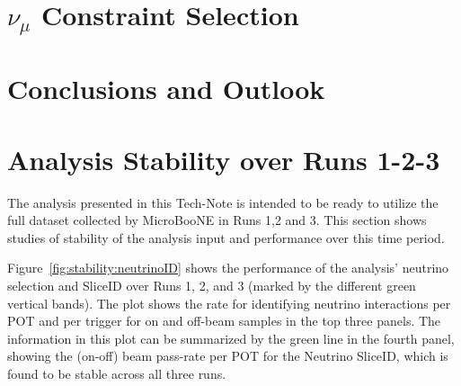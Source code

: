 \documentclass[a4paper]{article}
\begin{document}

\newpage





\clearpage


\section{$\nu_{\mu}$ Constraint Selection }
\label{sec:numuselection}

\clearpage

%

\clearpage



\newpage

\newpage

\section{Conclusions and Outlook}



\newpage

\appendix


\section{Analysis Stability over Runs 1-2-3}
\label{sec:timestability}

\par The analysis presented in this Tech-Note is intended to be ready to utilize the full dataset collected by MicroBooNE in Runs 1,2 and 3. This section shows studies of stability of the analysis input and performance over this time period.
\par Figure~\ref{fig:stability:neutrinoID} shows the performance of the analysis' neutrino selection and SliceID over Runs 1, 2, and 3 (marked by the different green vertical bands). The plot shows the rate for identifying neutrino interactions per POT and per trigger for on and off-beam samples in the top three panels. The information in this plot can be summarized by the green line in the fourth panel, showing the (on-off) beam pass-rate per POT for the Neutrino SliceID, which is found to be stable across all three runs.
\end{document}

